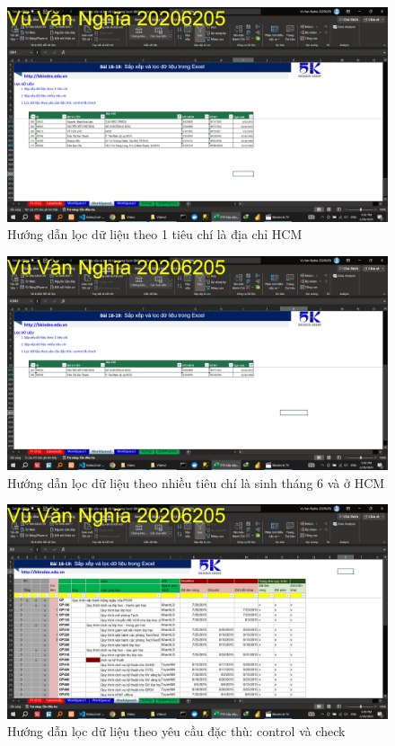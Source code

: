 \documentclass{article}
\begin{document}
\begin{figure}[h]
    \centering
    \includegraphics[scale = 0.15]{Video2/HuongDan/4.png}
    \caption{Hướng dẫn lọc dữ liệu theo 1 tiêu chí là địa chỉ HCM}
\end{figure}

\begin{figure}[h]
    \centering
    \includegraphics[scale = 0.15]{Video2/HuongDan/5.png}
    \caption{Hướng dẫn lọc dữ liệu theo nhiều tiêu chí là sinh tháng 6 và ở HCM}
\end{figure}

\begin{figure}[h]
    \centering
    \includegraphics[scale = 0.15]{Video2/HuongDan/6.png}
    \caption{Hướng dẫn lọc dữ liệu theo yêu cầu đặc thù: control và check}
\end{figure}
\end{document}
